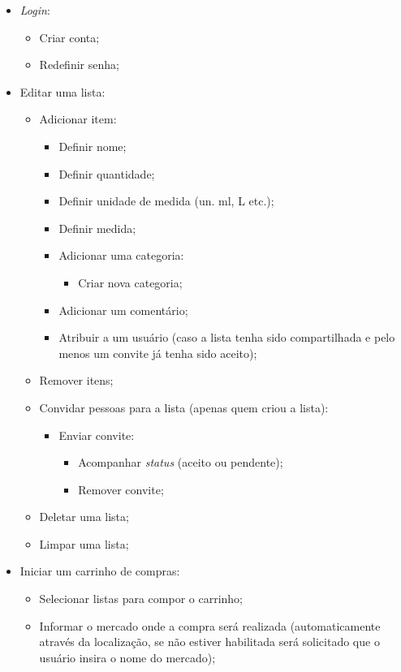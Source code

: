 \begin{itemize}
	\item \textit{Login}:
		\begin{itemize}
			\item Criar conta;
			\item Redefinir senha;
		\end{itemize}
	\item Editar uma lista:
		\begin{itemize}
			\item Adicionar item:
				\begin{itemize}
					\item Definir nome;
					\item Definir quantidade;
					\item Definir unidade de medida (un. ml, L etc.);
					\item Definir medida;
					\item Adicionar uma categoria:
						\begin{itemize}
							\item Criar nova categoria;
						\end{itemize}
					\item Adicionar um comentário;
					\item Atribuir a um usuário (caso a lista tenha sido compartilhada e pelo menos um convite já tenha sido aceito);
				\end{itemize}
			\item Remover itens;
			\item Convidar pessoas para a lista (apenas quem criou a lista):
				\begin{itemize}
					\item Enviar convite:
						\begin{itemize}
							\item Acompanhar \textit{status} (aceito ou pendente);
							\item Remover convite;
						\end{itemize}
				\end{itemize}
			\item Deletar uma lista;
			\item Limpar uma lista;
		\end{itemize}
	\item Iniciar um carrinho de compras:
		\begin{itemize}
			\item Selecionar listas para compor o carrinho;
			\item Informar o mercado onde a compra será realizada (automaticamente através da localização, se não estiver habilitada será solicitado que o usuário insira o nome do mercado);

\end{itemize}
\end{itemize}
